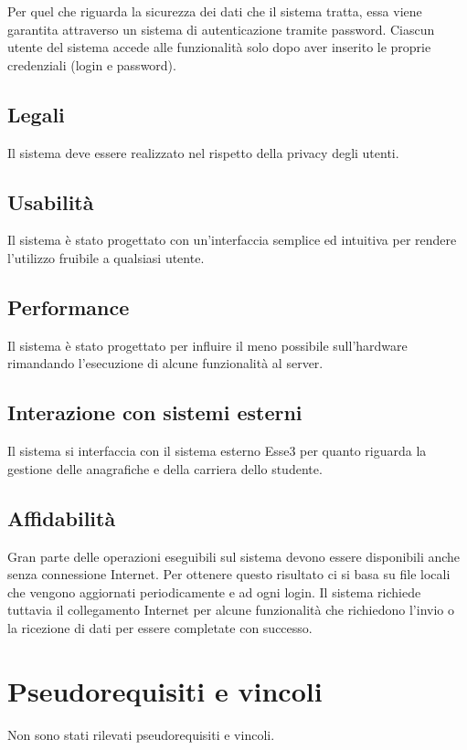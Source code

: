 Per quel che riguarda la sicurezza dei dati che il sistema tratta, essa viene garantita attraverso un sistema di autenticazione tramite password. Ciascun utente del sistema accede alle funzionalità solo dopo aver inserito le proprie credenziali (login e password).

\subsection{Legali}

Il sistema deve essere realizzato nel rispetto della privacy degli utenti.

\subsection{Usabilità}

Il sistema è stato progettato con un’interfaccia semplice ed intuitiva per rendere l’utilizzo fruibile a qualsiasi utente.

\subsection{Performance}

Il sistema è stato progettato per influire il meno possibile sull’hardware rimandando l’esecuzione di alcune funzionalità al server.

\subsection{Interazione con sistemi esterni}

Il sistema si interfaccia con il sistema esterno Esse3 per quanto riguarda la gestione delle anagrafiche e della carriera dello studente.

\subsection{Affidabilità}

Gran parte delle operazioni eseguibili sul sistema devono essere disponibili anche senza connessione Internet. Per ottenere questo risultato ci si basa su file locali che vengono aggiornati periodicamente e ad ogni login. Il sistema richiede tuttavia il collegamento Internet per alcune funzionalità che richiedono l’invio o la ricezione di dati per essere completate con successo.


\section{Pseudorequisiti e vincoli}

Non sono stati rilevati pseudorequisiti e vincoli.

\clearpage